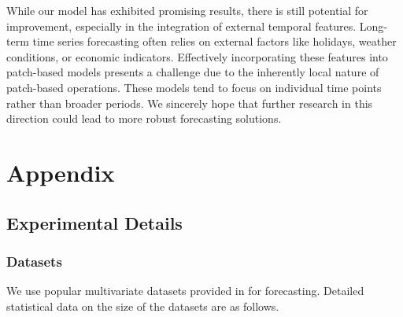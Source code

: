 \documentclass{article} \usepackage{iclr2024_conference,times}
\begin{document}
While our model has exhibited promising results, there is still potential for improvement, especially in the integration of external temporal features. Long-term time series forecasting often relies on external factors like holidays, weather conditions, or economic indicators. Effectively incorporating these features into patch-based models presents a challenge due to the inherently local nature of patch-based operations. These models tend to focus on individual time points rather than broader periods. We sincerely hope that further research in this direction could lead to more robust forecasting solutions.




\appendix
\section{Appendix}
\subsection{Experimental Details}
\label{append:exp}

\subsubsection{Datasets}
\label{sec::datasets}
We use  popular multivariate datasets provided in \citep{autoformer} for forecasting. Detailed statistical data on the size of the datasets are as follows.


\begin{table}[htbp!]
\centering
{}
\caption{Statistics of popular datasets used for benchmarking.}
\label{tab::datasets}
\end{table}
\end{document}

